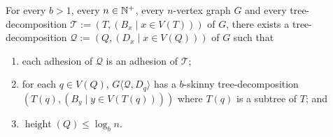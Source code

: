 \documentclass{patmorin}
\renewcommand{\le}{\leqslant}
\newcommand{\torso}[2]{{#1}\langle{#2}\rangle}
\DeclareMathOperator{\height}{height}
\newcommand{\calQ}{\mathcal{Q}}
\newcommand{\calT}{\mathcal{T}}
\begin{document}
\begin{cor}\label{b_skinny_decomp}
  For every $b>1$, every $n\in\mathbb{N}^+$, every $n$-vertex graph $G$ and every tree-decomposition $\calT:=(T,(B_x\mid x\in V(T)))$ of $G$, there exists a tree-decomposition $\calQ:=(Q,(D_x\mid x\in V(Q)))$ of $G$ such that
  \begin{enumerate}[nosep,nolistsep,label=\rm(\alph*)]
    \item\label{prop_adhesion}
          each adhesion of $\calQ$ is an adhesion of $\calT$;
    \item\label{prop_skinny_torso} for each $q\in V(Q)$, $\torso{G}{\calQ,D_q}$ has a $b$-skinny tree-decomposition $(T(q), (B_y\mid y\in V(T(q))))$ where $T(q)$ is a subtree of $T$; and
    \item\label{prop_geometric} $\height(Q)\le \log_b n$.
  \end{enumerate}
\end{cor}
\end{document}

